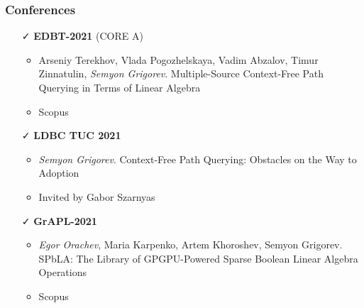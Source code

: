 \documentclass[xcolor=table, aspectratio=169]{beamer}
\begin{document}
\begin{frame}[fragile]
\frametitle{Conferences}
\begin{itemize}

      \item[\faCheck] \textbf{EDBT-2021} (CORE A) 
      \begin{itemize}
        \item Arseniy Terekhov, Vlada Pogozhelskaya, Vadim Abzalov, Timur Zinnatulin, \emph{Semyon Grigorev}. Multiple-Source Context-Free Path Querying in Terms of Linear Algebra
        \item Scopus
      \end{itemize}
        
      \item[\faCheck] \textbf{LDBC TUC 2021}
      \begin{itemize}
         \item \emph{Semyon Grigorev}. Context-Free Path Querying: Obstacles on the Way to Adoption
         \item Invited by Gabor Szarnyas
      \end{itemize}

      \item[\faCheck] \textbf{GrAPL-2021}
      \begin{itemize}
         \item \emph{Egor Orachev}, Maria Karpenko, Artem Khoroshev, Semyon Grigorev. SPbLA: The Library of GPGPU-Powered Sparse Boolean Linear Algebra Operations
         \item Scopus
      \end{itemize}

    \end{itemize}
    \end{frame}
\end{document}
